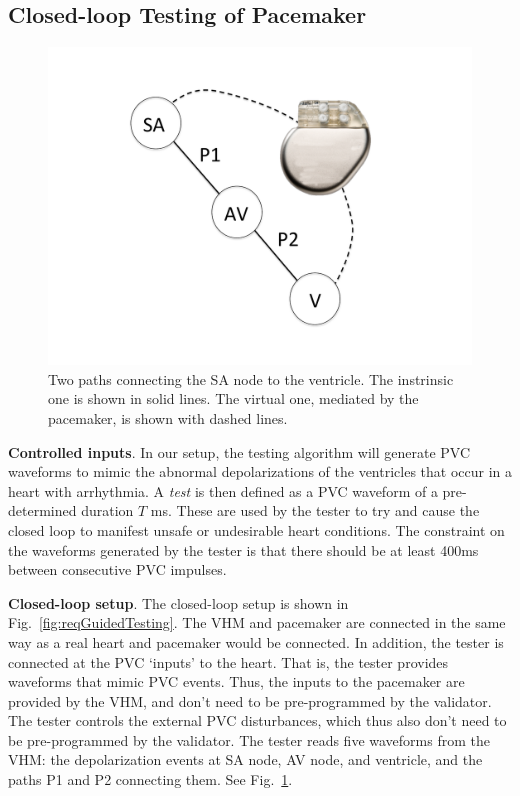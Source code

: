 \subsection{Closed-loop Testing of Pacemaker}
\label{closedloop}

\begin{figure}[t]
\centering
\includegraphics[scale=0.2]{figures/nodesandPM}
\caption{Two paths connecting the SA node to the ventricle. The instrinsic one is shown in solid lines. The virtual one, mediated by the pacemaker, is shown with dashed lines.}
\label{fig:nodesandPM}
\end{figure}

\textbf{Controlled inputs}.
In our setup, the testing algorithm will generate PVC waveforms to mimic the abnormal depolarizations of the ventricles that occur in a heart with arrhythmia. 
A \emph{test} is then defined as a PVC waveform of a pre-determined duration $T$ ms.
These are used by the tester to try and cause the closed loop to manifest unsafe or undesirable heart conditions.
The constraint on the waveforms generated by the tester is that there should be at least 400ms between consecutive PVC impulses.

\textbf{Closed-loop setup}.
The closed-loop setup is shown in Fig.~\ref{fig:reqGuidedTesting}.
The VHM and pacemaker are connected in the same way as a real heart and pacemaker would be connected.
In addition, the tester is connected at the PVC `inputs' to the heart.
That is, the tester provides waveforms that mimic PVC events.
Thus, the inputs to the pacemaker are provided by the VHM, and don't need to be pre-programmed by the validator. 
The tester controls the external PVC disturbances, which thus also don't need to be pre-programmed by the validator.
The tester reads five waveforms from the VHM: the depolarization events at SA node, AV node, and ventricle, and the paths P1 and P2 connecting them. 
See Fig.~\ref{fig:nodesandPM}.


